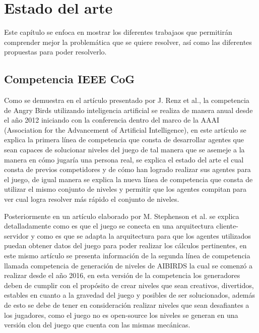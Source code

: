 \chapter{Estado del arte}
\label{chapter:related-work}

Este capítulo se enfoca en mostrar los diferentes trabajaos que permitirán
comprender mejor la problemática que se quiere resolver, así como las
diferentes propuestas para poder resolverlo.

\section{Competencia IEEE CoG}
\label{section:ieeecog}

Como se demuestra en el artículo presentado por J. Renz et al.\cite{Renz2016}, la
competencia de Angry Birds utilizando inteligencia artificial se realiza de
manera anual desde el año 2012 iniciando con la conferencia dentro del marco de
la AAAI (Association for the Advancement of Artificial Intelligence), en este
artículo se explica la primera línea de competencia que consta de desarrollar
agentes que sean capaces de solucionar niveles del juego de tal manera que se
asemeje a la manera en cómo jugaría una persona real, se explica el estado del
arte el cual consta de previos competidores y de cómo han logrado realizar sus
agentes para el juego, de igual manera se explica la nueva línea de competencia
que consta de utilizar el mismo conjunto de niveles y permitir que los agentes
compitan para ver cual logra resolver más rápido el conjunto de niveles.

Posteriormente en un artículo elaborado por M. Stephenson et
al.\cite{Stephenson2018The2A} se explica detalladamente como es que el juego se
conecta en una arquitectura cliente-servidor y como es que se adapta la
arquitectura para que los agentes utilizados puedan obtener datos del juego para
poder realizar los cálculos pertinentes, en este mismo artículo se presenta
información de la segunda línea de competencia llamada competencia de generación
de niveles de AIBIRDS la cual se comenzó a realizar desde el año 2016, en esta
versión de la competencia los generadores deben de cumplir con el propósito de
crear niveles que sean creativos, divertidos, estables en cuanto a la gravedad
del juego y posibles de ser solucionados, además de esto se debe de tener en
consideración realizar niveles que sean desafiantes a los jugadores, como el
juego no es open-source los niveles se generan en una versión clon del juego que
cuenta con las mismas mecánicas.

